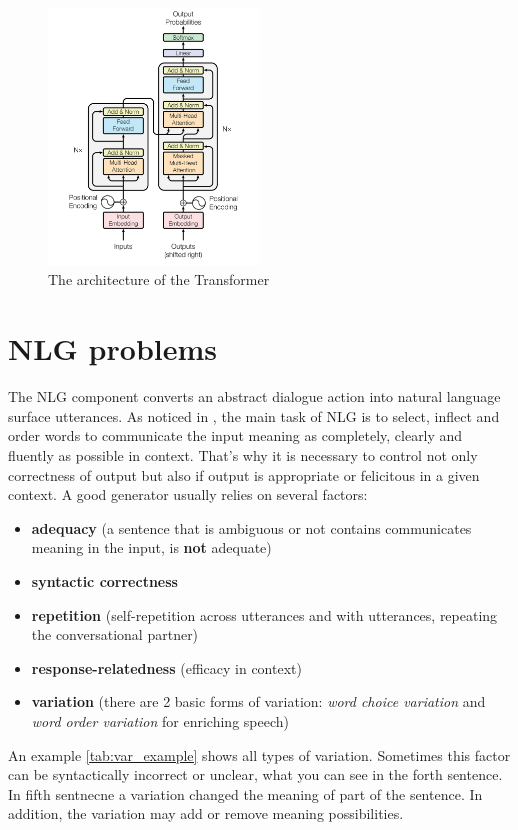 \begin{figure}[hbt]
  \centering
  \includegraphics[width=0.5\textwidth]{figures/transformer.png}
  \caption{The architecture of the Transformer\cite{transformer}}
  \label{transformer}
\end{figure}

\section{NLG problems}
The NLG component converts an abstract dialogue action into natural language surface utterances. As noticed in \cite{generator_problems}, the main task of NLG is to select, inflect and order words to communicate the input meaning as completely, clearly and fluently as possible in context. That's why it is necessary to control not only correctness of output but also if output is appropriate or felicitous in a given context. A good generator usually relies on several factors:
\begin{itemize}
  \item \textbf{adequacy} (a sentence that is ambiguous or not contains communicates meaning in the input, is \textbf{not} adequate)  
  \item \textbf{syntactic correctness} 
  \item \textbf{repetition} (self-repetition across utterances and with utterances, repeating the conversational partner)
  \item \textbf{response-relatedness} (efficacy in context)
  \item \textbf{variation} (there are 2 basic forms of variation: \textit{word choice variation} and \textit{word order variation} for enriching speech)
\end{itemize}
An example \ref{tab:var_example} shows all types of variation. Sometimes this factor can be syntactically incorrect or unclear, what you can see in the forth sentence. In fifth sentnecne a variation changed the meaning of part of the sentence. In addition, the variation may add or remove meaning possibilities.

